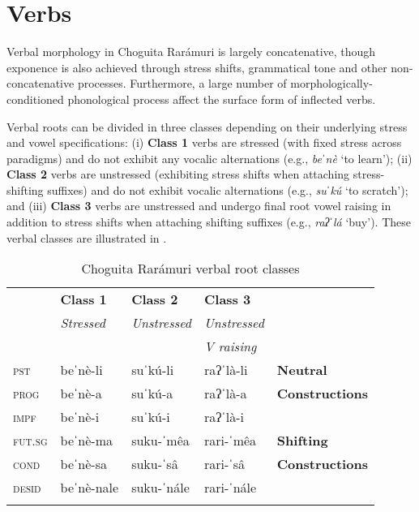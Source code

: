 \section{Verbs}
\label{sec: verbs}

Verbal morphology in Choguita Rarámuri is largely concatenative, though exponence is also achieved through stress shifts, grammatical tone and other non-concatenative processes. Furthermore, a large number of morphologically-con\-di\-tioned phonological process affect the surface form of inflected verbs.

Verbal roots can be divided in three classes depending on their underlying stress and vowel specifications: (i) \textbf{Class 1} verbs are stressed (with fixed stress across paradigms) and do not exhibit any vocalic alternations (e.g., \textit{beˈnè} `to learn'); (ii) \textbf{Class 2} verbs are unstressed (exhibiting stress shifts when attaching stress-shifting suffixes) and do not exhibit vocalic alternations (e.g., \textit{suˈkú} `to scratch'); and (iii) \textbf{Class 3} verbs are unstressed and undergo final root vowel raising in addition to stress shifts when attaching shifting suffixes (e.g., \textit{raʔˈlá} `buy'). These verbal classes are illustrated in .

\begin{table}
\caption{Choguita Rarámuri verbal root classes}
\label{tab:verb-classses}

\begin{tabularx}{\textwidth}{lXXXX}
\lsptoprule
& \textbf{Class 1} & \textbf{Class 2}  & \textbf{Class 3} & \\
& \textit{Stressed} & \textit{Unstressed} & \textit{Unstressed} &  \\
& &  & \textit{V raising} & \\
\midrule
\textsc{pst} &  beˈnè-li  &     suˈkú-li      &   raʔˈlà-li & \textbf{Neutral}\\
\textsc{prog} &  beˈnè-a &    suˈkú-a &  raʔˈlà-a    & \textbf{Constructions}\\
\textsc{impf} &   beˈnè-i &   suˈkú-i  &  raʔˈlà-i &              \\
\tablevspace
\textsc{fut.sg} & beˈnè-ma   &          suku-ˈmêa   &     rari-ˈmêa & \textbf{Shifting}\\
\textsc{cond} &  beˈnè-sa & suku-ˈsâ    &  rari-ˈsâ &   \textbf{Constructions}\\
\textsc{desid} &  beˈnè-nale    & suku-ˈnále    &  rari-ˈnále & \\
\lspbottomrule
\end{tabularx}
\end{table}


